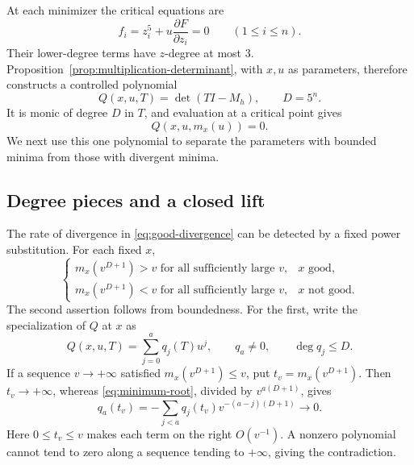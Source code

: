 At each minimizer the critical equations are
\[
 f_i=z_i^5+u\frac{\partial F}{\partial z_i}=0
 \qquad(1\le i\le n).
\]
Their lower-degree terms have $z$-degree at most $3$.
Proposition~\ref{prop:multiplication-determinant}, with $x,u$ as
parameters, therefore constructs a controlled polynomial
\begin{equation}\label{eq:fiber-characteristic}
 Q(x,u,T)=\det(TI-M_h),\qquad D=5^n.
\end{equation}
It is monic of degree $D$ in $T$, and evaluation at a critical point
gives
\begin{equation}\label{eq:minimum-root}
 Q(x,u,m_x(u))=0.
\end{equation}
We next use this one polynomial to separate the parameters with bounded
minima from those with divergent minima.

\subsection{Degree pieces and a closed lift}

The rate of divergence in \eqref{eq:good-divergence} can be detected by
a fixed power substitution.  For each fixed $x$,
\begin{equation}\label{eq:growth-test}
 \begin{cases}
 m_x(v^{D+1})>v\text{ for all sufficiently large }v,&x\text{ good},\\
 m_x(v^{D+1})<v\text{ for all sufficiently large }v,&x\text{ not good}.
 \end{cases}
\end{equation}
The second assertion follows from boundedness.  For the first, write
the specialization of $Q$ at $x$ as
\[
 Q(x,u,T)=\sum_{j=0}^a q_j(T)u^j,\qquad q_a\ne0,
 \qquad\deg q_j\le D.
\]
If a sequence $v\to+\infty$ satisfied $m_x(v^{D+1})\le v$, put
$t_v=m_x(v^{D+1})$.  Then $t_v\to+\infty$, whereas
\eqref{eq:minimum-root}, divided by $v^{a(D+1)}$, gives
\[
 q_a(t_v)=-\sum_{j<a}q_j(t_v)v^{-(a-j)(D+1)}\longrightarrow0.
\]
Here $0\le t_v\le v$ makes each term on the right $O(v^{-1})$.
A nonzero polynomial cannot tend to zero along a sequence tending to
$+\infty$, giving the contradiction.

